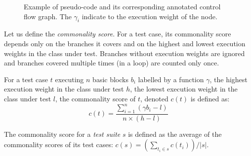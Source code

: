 \begin{figure}
{\begin{minipage}{0.30\textwidth}
{\begin{tikzpicture}[roundnode/.style={circle, draw=black, fill=white, thick, scale=2.0, transform shape}]
            \end{tikzpicture}
            }
        \end{minipage}
    }
    \caption{Example of pseudo-code and its corresponding annotated control flow graph. The $\gamma_i$ indicate to the execution weight of the node.}
    \label{fig:example}
\end{figure}

Let us define the \emph{commonality score}. For a test case, its commonality score depends only on the branches it covers and on the highest and lowest execution weights in the class under test. Branches without execution weights are ignored and branches covered multiple times (\eg in a loop) are counted only once. 
%
\begin{definition}
    For a test case $t$ executing $n$ basic blocks $b_i$ labelled by a function $\gamma$, the highest execution weight in the class under test $h$, the lowest execution weight in the class under test $l$, the commonality score of $t$, denoted $c(t)$ is defined as:
    $$c(t) = \frac{\sum_{i = 1}^{n} \left( \gamma b_i - l \right)}{n \times (h-l)}$$
\end{definition}
%
The commonality score for a \emph{test suite} $s$ is defined as the average of the commonality scores of its test cases: $c(s) = \left( \sum_{t_i \in s} c(t_i) \right) / \vert s \vert $.

